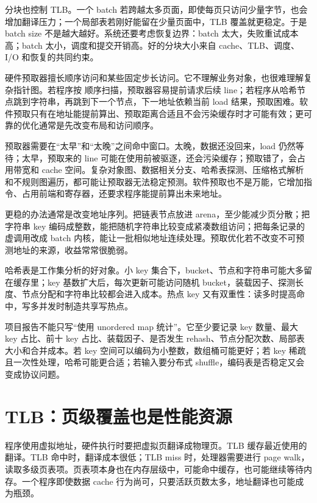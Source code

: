 分块也控制 TLB。一个 batch 若跨越太多页面，即使每页只访问少量字节，也会增加翻译压力；一个局部表若刚好能留在少量页面中，TLB 覆盖就更稳定。于是 batch size 不是越大越好。系统还要考虑恢复边界：batch 太大，失败重试成本高；batch 太小，调度和提交开销高。好的分块大小来自 cache、TLB、调度、I/O 和恢复的共同约束。

硬件预取器擅长顺序访问和某些固定步长访问。它不理解业务对象，也很难理解复杂指针图。若程序按  顺序扫描，预取器容易提前请求后续 line；若程序从哈希节点跳到字符串，再跳到下一个节点，下一地址依赖当前 load 结果，预取困难。软件预取只有在地址能提前算出、预取距离合适且不会污染缓存时才可能有效；更可靠的优化通常是先改变布局和访问顺序。

预取器需要在“太早”和“太晚”之间命中窗口。太晚，数据还没回来，load 仍然等待；太早，预取来的 line 可能在使用前被驱逐，还会污染缓存；预取错了，会占用带宽和 cache 空间。复杂对象图、数据相关分支、哈希表探测、压缩格式解析和不规则图遍历，都可能让预取器无法稳定预测。软件预取也不是万能，它增加指令、占用前端和寄存器，还要求程序能提前算出未来地址。

更稳的办法通常是改变地址序列。把链表节点放进 arena，至少能减少页分散；把字符串 key 编码成整数，能把随机字符串比较变成紧凑数组访问；把每条记录的虚调用改成 batch 内核，能让一批相似地址连续处理。预取优化若不改变不可预测地址的来源，收益常常很脆弱。

哈希表是工作集分析的好对象。小 key 集合下，bucket、节点和字符串可能大多留在缓存里；key 基数扩大后，每次更新可能访问随机 bucket，装载因子、探测长度、节点分配和字符串比较都会进入成本。热点 key 又有双重性：读多时提高命中，写多并发时制造共享写热点。

项目报告不能只写“使用 unordered map 统计”。它至少要记录 key 数量、最大 key 占比、前十 key 占比、装载因子、是否发生 rehash、节点分配次数、局部表大小和合并成本。若 key 空间可以编码为小整数，数组桶可能更好；若 key 稀疏且一次性处理，哈希可能更合适；若输入要分布式 shuffle，编码表是否稳定又会变成协议问题。

\section{TLB：页级覆盖也是性能资源}

程序使用虚拟地址，硬件执行时要把虚拟页翻译成物理页。TLB 缓存最近使用的翻译。TLB 命中时，翻译成本很低；TLB miss 时，处理器需要进行 page walk，读取多级页表项。页表项本身也在内存层级中，可能命中缓存，也可能继续等待内存。一个程序即使数据 cache 行为尚可，只要活跃页数太多，地址翻译也可能成为瓶颈。

